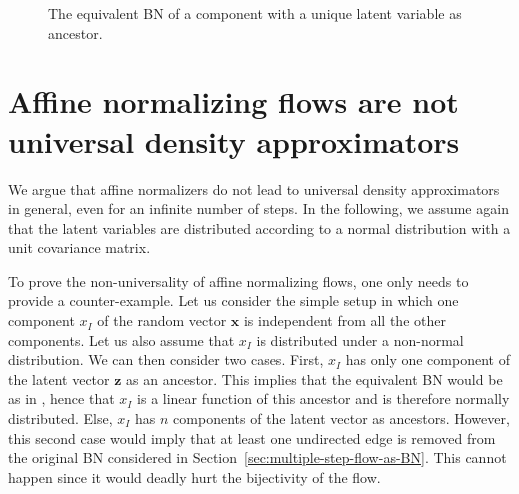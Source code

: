 \begin{figure}
    \centering

    \caption{The equivalent BN of a component with a unique latent variable as ancestor.}
    \label{fig:BN-x-I}
\end{figure}

\section{Affine normalizing flows are not universal density approximators}

We argue that affine normalizers do not lead to universal density approximators in general, even for an infinite number of steps. In the following, we assume again that the latent variables are distributed according to a normal distribution with a unit covariance matrix.


To prove the non-universality of affine normalizing flows, one only needs to provide a counter-example.
Let us consider the simple setup in which one component $x_I$ of the random vector $\mathbf x$ is independent from all the other components.
Let us also assume that $x_I$ is distributed under a non-normal distribution.
We can then consider two cases.
First, $x_I$ has only one component of the latent vector $\mathbf z$ as an ancestor. This implies that the equivalent BN would be as in , hence that $x_I$ is a linear function of this ancestor and is therefore normally distributed.
Else, $x_I$ has $n$ components of the latent vector as ancestors.
However, this second case would imply that at least one undirected edge is removed from the original BN considered in Section~\ref{sec:multiple-step-flow-as-BN}.
This cannot happen since it would deadly hurt the bijectivity of the flow.


